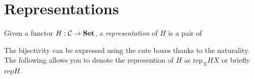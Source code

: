 \section{Representations}

\begin{definition}[Representation]
\label{rep.def}
Given a functor $H : \mathcal{C} \to \boldsymbol{\mathrm{Set}}$, a \emph{representation} of $H$ is a pair of 
\end{definition}
The bijectivity can be expressed using the cute boxes
thanks to the naturality.
\mynewline
The following allows you to denote the represention of $H$ as %
$\text{rep}_X HX$ or briefly $\text{rep}H$.

